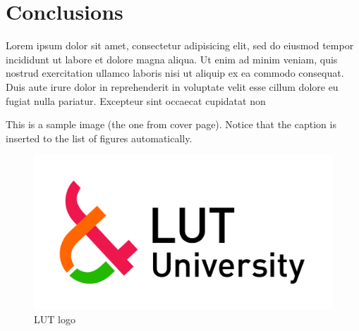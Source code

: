 \section{Conclusions}
\label{sec:conclusion}

Lorem ipsum dolor sit amet, consectetur adipisicing elit, sed do eiusmod
tempor incididunt ut labore et dolore magna aliqua. Ut enim ad minim veniam,
quis nostrud exercitation ullamco laboris nisi ut aliquip ex ea commodo
consequat. Duis aute irure dolor in reprehenderit in voluptate velit esse
cillum dolore eu fugiat nulla pariatur. Excepteur sint occaecat cupidatat non

This is a sample image (the one from cover page). Notice that the caption is inserted to the list of figures automatically.

\begin{figure}[h!]
    \centering
    \includegraphics[width=0.5\linewidth]{images/LUT-logo.png}
    \caption{LUT logo}
    \label{fig:logo}
\end{figure}

\clearpage
